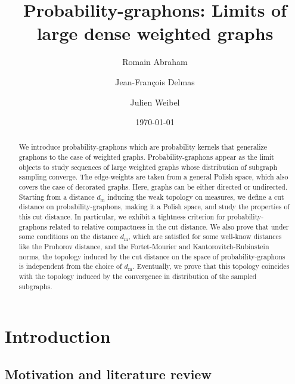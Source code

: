\documentclass{amsart}
\title{Probability-graphons: Limits of large dense weighted graphs}
\date{\today}
\author{Romain Abraham}
\author{Jean-Fran\c{c}ois Delmas}
\author{Julien Weibel}
\theoremstyle{plain}
\theoremstyle{definition}
\newcommand{\m}{\mathrm{m}}
\newcommand{\dmeas}{d_\m}
\begin{document}



\begin{abstract}
  We introduce  probability-graphons which are probability  kernels that
  generalize    graphons   to    the    case    of   weighted    graphs.
  Probability-graphons appear as the limit objects to study sequences of
  large  weighted   graphs  whose  distribution  of   subgraph  sampling
  converge.  The  edge-weights are  taken from  a general  Polish space,
  which also covers  the case of decorated graphs.  Here,  graphs can be
  either  directed or  undirected.   Starting from  a distance  $\dmeas$
  inducing the  weak topology on measures,  we define a cut  distance on
  probability-graphons,  making  it  a   Polish  space,  and  study  the
  properties  of  this  cut  distance.   In  particular,  we  exhibit  a
  tightness  criterion  for  probability-graphons  related  to  relative
  compactness  in the  cut  distance.   We also  prove  that under  some
  conditions  on the  distance $\dmeas$,  which are  satisfied for  some
  well-know distances like the Prohorov distance, and the Fortet-Mourier
  and  Kantorovitch-Rubinstein norms,  the topology  induced by  the cut
  distance on the space of  probability-graphons is independent from the
  choice of $\dmeas$.  Eventually, we prove that this topology coincides
  with the  topology induced by  the convergence in distribution  of the
  sampled subgraphs.
\end{abstract}


\maketitle





\section{Introduction}

\subsection{Motivation and literature review}
\end{document}
